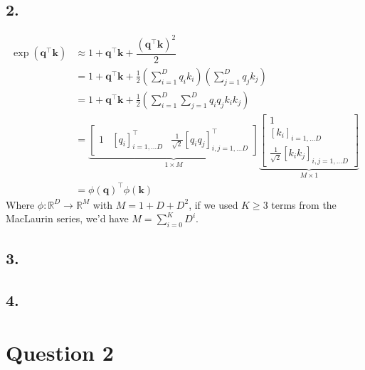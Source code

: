 \documentclass[11pt]{article}
\begin{document}
\subsection{2.}
\begin{align*}
  \exp \left( \bm{q}^{\top} \bm{k} \right) &\approx 1 + \bm{q}^{\top} \bm{k} + \dfrac{\left( \bm{q}^{\top} \bm{k} \right)^{2}}{2} \\
                                           &= 1 + \bm{q}^{\top} \bm{k} + \frac{1}{2} \left( \sum_{i = 1}^{D} q_{i} k_{i} \right) \left( \sum_{j = 1}^{D} q_{j} k_{j} \right)\\
                                           &= 1 + \bm{q}^{\top} \bm{k} + \frac{1}{2} \left( \sum_{i = 1}^{D} \sum_{j = 1}^{D} q_{i} q_{j} k_{i} k_{j} \right) \\
                                           &= \underbrace{\begin{bmatrix}
                                                            1 & \left[ q_{i} \right]_{i = 1, \dots D}^{\top} &\frac{1}{\sqrt{2}} [q_{i}q_{j}]_{i, j = 1, \dots D}^{\top}
                                                          \end{bmatrix}}_{1 \times M}
                                             \underbrace{\begin{bmatrix}
                                                           1 \\
                                                           \left[ k_{i} \right]_{i = 1, \dots D} \\
                                                           \frac{1}{\sqrt{2}} [k_{i}k_{j}]_{i, j = 1, \dots D}
                                                         \end{bmatrix}}_{M \times 1} \\
  &= \phi \left( \bm{q} \right)^{\top} \phi \left( \bm{k} \right)
\end{align*}
Where $\phi : \mathbb{R}^{D} \to \mathbb{R}^{M}$ with $M = 1 + D + D^{2}$, if we used $K \geq 3$ terms from the MacLaurin series, we'd have $M = \sum_{i = 0}^{K} D^{i}$.
\pagebreak
\subsection{3.}
\subsection{4.}
\section{Question 2}
\end{document}
